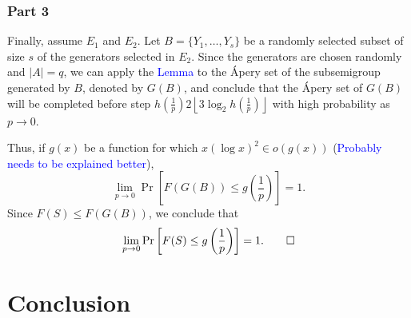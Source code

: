 \subsubsection*{Part 3}

\par Finally, assume $E_1$ and $E_2$. Let $B = \{Y_{1}, \ldots, Y_{s}\}$ be a randomly selected subset of size $s$ of the generators selected in $E_2$.  Since the generators are chosen randomly and $|A| = q$, we can apply the \textcolor{blue}{Lemma} to the Ápery set of the subsemigroup generated by $B$, denoted by $G(B)$, and conclude that the Ápery set of $G(B)$ will be completed before step $h\left(\frac{1}{p}\right)2\left\lfloor 3\log_2 h\left(\frac{1}{p}\right)\right\rfloor$ with high probability as $p \to 0$. 
\par Thus, if $g(x)$ be a function for which $x(\log x)^2 \in o(g(x))$ (\textcolor{blue}{Probably needs to be explained better}),
\[\lim_{p \to  0} \Pr\left[F(G(B)) \leq g\left(\frac{1}{p}\right)\right] = 1.\]
Since $F(S) \leq F(G(B))$, we conclude that
\[\lim_{p \to 0}\Pr\left[F(S) \leq g\left(\frac{1}{p}\right)\right] = 1. \qed \] 


\section{Conclusion}
